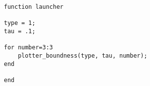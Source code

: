 \begin{verbatim}
function launcher
    
type = 1;
tau = .1;

for number=3:3
    plotter_boundness(type, tau, number);
end

end
\end{verbatim}
